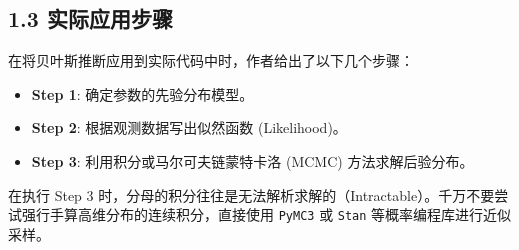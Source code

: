 \documentclass[UTF8, 11pt, a4paper]{ctexart}
\begin{document}
\subsection{1.3 实际应用步骤}
在将贝叶斯推断应用到实际代码中时，作者给出了以下几个步骤：
\begin{itemize}[itemsep=3pt, parsep=0pt]
    \item \textbf{Step 1}: 确定参数的先验分布模型。
    \item \textbf{Step 2}: 根据观测数据写出似然函数 (Likelihood)。
    \item \textbf{Step 3}: 利用积分或马尔可夫链蒙特卡洛 (MCMC) 方法求解后验分布。
\end{itemize}

\begin{warningbox}
在执行 Step 3 时，分母的积分往往是无法解析求解的（Intractable）。千万不要尝试强行手算高维分布的连续积分，直接使用 \texttt{PyMC3} 或 \texttt{Stan} 等概率编程库进行近似采样。
\end{warningbox}
\end{document}
